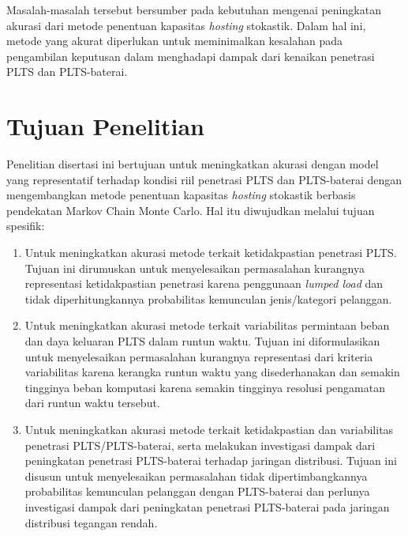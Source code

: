 
Masalah-masalah tersebut bersumber pada kebutuhan mengenai peningkatan akurasi dari metode penentuan kapasitas \textit{hosting} stokastik. Dalam hal ini, metode yang akurat diperlukan untuk meminimalkan kesalahan pada pengambilan keputusan dalam menghadapi dampak dari kenaikan penetrasi PLTS dan PLTS-baterai.

\section{Tujuan Penelitian}
Penelitian disertasi ini bertujuan untuk meningkatkan akurasi dengan model yang representatif terhadap kondisi riil penetrasi PLTS dan PLTS-baterai dengan mengembangkan metode penentuan kapasitas \textit{hosting} stokastik berbasis pendekatan Markov Chain Monte Carlo. Hal itu diwujudkan melalui tujuan spesifik:
\begin{enumerate}
    \item Untuk meningkatkan akurasi metode terkait ketidakpastian penetrasi PLTS. Tujuan ini dirumuskan untuk menyelesaikan permasalahan kurangnya representasi ketidakpastian penetrasi karena penggunaan \textit{lumped load} dan tidak diperhitungkannya probabilitas kemunculan jenis/kategori pelanggan.
    \item Untuk meningkatkan akurasi metode terkait variabilitas permintaan beban dan daya keluaran PLTS dalam runtun waktu. Tujuan ini diformulasikan untuk menyelesaikan permasalahan kurangnya representasi dari kriteria variabilitas karena kerangka runtun waktu yang disederhanakan dan semakin tingginya beban komputasi karena semakin tingginya resolusi pengamatan dari runtun waktu tersebut.
    \item Untuk meningkatkan akurasi metode terkait ketidakpastian dan variabilitas penetrasi PLTS/PLTS-baterai, serta melakukan investigasi dampak dari peningkatan penetrasi PLTS-baterai terhadap jaringan distribusi. Tujuan ini disusun untuk menyelesaikan permasalahan tidak dipertimbangkannya probabilitas kemunculan pelanggan dengan PLTS-baterai dan perlunya investigasi dampak dari peningkatan penetrasi PLTS-baterai pada jaringan distribusi tegangan rendah.
\end{enumerate}


